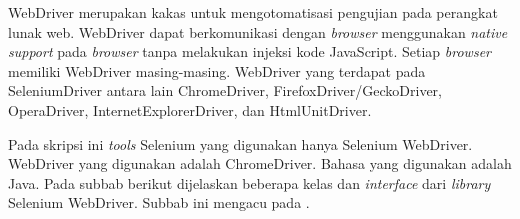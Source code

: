WebDriver merupakan kakas untuk mengotomatisasi pengujian pada perangkat lunak web\cite{Selenium_doc}. WebDriver dapat berkomunikasi dengan \textit{browser} menggunakan \textit{native support} pada \textit{browser} tanpa melakukan injeksi kode JavaScript. Setiap \textit{browser} memiliki WebDriver masing-masing. WebDriver yang terdapat pada SeleniumDriver antara lain ChromeDriver, FirefoxDriver/GeckoDriver, OperaDriver, InternetExplorerDriver, dan HtmlUnitDriver. 

Pada skripsi ini \textit{tools} Selenium yang digunakan hanya Selenium WebDriver. WebDriver yang digunakan adalah ChromeDriver. Bahasa yang digunakan adalah Java. Pada subbab berikut dijelaskan beberapa kelas dan \textit{interface} dari \textit{library} Selenium WebDriver. Subbab ini mengacu pada \cite{Selenium_java_doc}.

